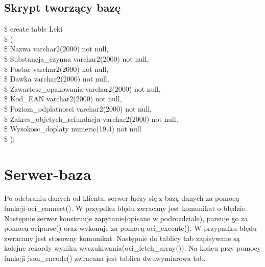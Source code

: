 \documentclass[10pt, a4paper]{article}
\begin{document}
\subsection{Skrypt tworzący bazę}
\$ create table Leki\\
\$ (\\
\$ \hspace{6mm} Nazwa varchar2(2000) not null,\\
\$ \hspace{6mm} Substancja\_czynna varchar2(2000) not null,\\
\$ \hspace{6mm} Postac  varchar2(2000) not null,\\
\$ \hspace{6mm} Dawka  varchar2(2000) not null,\\
\$ \hspace{6mm} Zawartosc\_opakowania  varchar2(2000) not null,\\
\$ \hspace{6mm} Kod\_EAN varchar2(2000) not null,\\
\$ \hspace{6mm} Poziom\_odplatnosci varchar2(2000) not null,\\
\$ \hspace{6mm} Zakres\_objetych\_refundacja varchar2(2000) not null,\\
\$ \hspace{6mm} Wysokosc\_doplaty numeric(19,4) not null\\
\$ );\\



\section{Serwer-baza}
Po odebraniu danych od klienta, serwer łączy się z bazą danych za pomocą funkcji oci\_connect(). W przypdku błędu zwracany jest komunikat o błędzie.
Następnie serwer konstruuje zapytanie(opisane w podrozdziale), parsuje go za pomocą ociparse() oraz wykonuje za pomocą oci\_execute().
W przypadku błędu zwracany jest stosowny komunikat.
Następnie do tablicy tab zapisywane są kolejne rekordy wyniku wyszukiwania(oci\_fetch\_array()). Na końcu przy pomocy funkcji json\_encode() zwracana jest tablica dwuwymiarowa tab.
\end{document}
